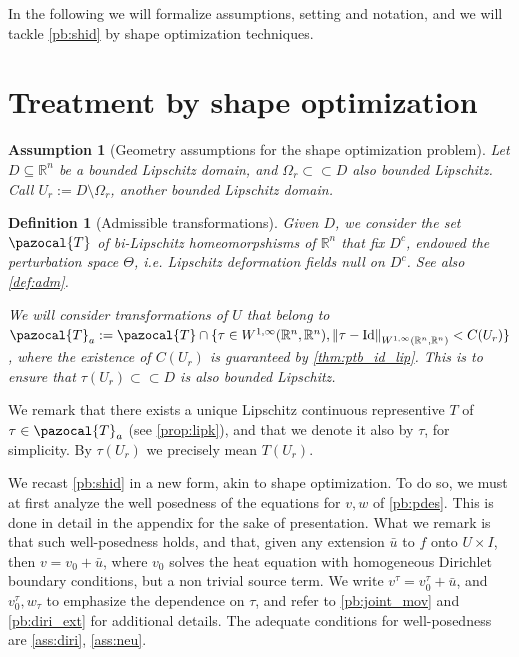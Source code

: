 \documentclass[english,a4paper,9pt,oneside]{scrbook}	%
\theoremstyle{break}
\newtheorem{defn}[equation]{Definition}
\newtheorem{ass}[equation]{Assumption}
\theoremstyle{remark}
\newcommand{\mR}{\mathbb{R}}
\newcommand{\norm}[1]{\left\lVert#1\right\rVert}
\newcommand{\cc}{\subset\subset}
\newcommand{\cT}{\pazocal{T}}
\newcommand{\id}{\text{Id}}
\newcommand{\Te}{\Theta}
\begin{document}
In the following we will formalize assumptions, setting and notation, and we will tackle \cref{pb:shid} by shape optimization techniques.

\section{Treatment by shape optimization}
\label{sec:shopt_treatment}

\begin{ass}[Geometry assumptions for the shape optimization problem]
\label{ass:geo_sh}
Let $D\subseteq \mR^n$ be a bounded Lipschitz domain, and $\Omega_r \cc D$ also bounded Lipschitz. Call $U_r:=D\setminus \Omega_r$, another bounded Lipschitz domain.
\end{ass}

\begin{defn}[Admissible transformations]

Given $D$, we consider the set $\cT$ of bi-Lipschitz homeomorpshisms of $\mR^n$ that fix $D^c$, endowed the perturbation space $\Te$, i.e. Lipschitz deformation fields null on $D^c$. See also \cref{def:adm}.

We will consider transformations of $U$ that belong to $\cT_a:=\cT \cap \{ \tau \in W^{1,\infty}(\mR^n, \mR^n), \norm{\tau - \id}_{W^{1,\infty}(\mR^n, \mR^n)}<C(U_r)\}$, where the existence of $C(U_r)$ is guaranteed by \cref{thm:ptb_id_lip}. This is to ensure that $\tau(U_r)\cc D$ is also bounded Lipschitz.


\end{defn}

We remark that there exists a unique Lipschitz continuous representive $T$ of $\tau \in \cT_a$ (see \cref{prop:lipk}), and that we denote it also by $\tau$, for simplicity. By $\tau(U_r)$ we precisely mean $T(U_r)$.

We recast \cref{pb:shid} in a new form, akin to shape optimization. To do so, we must at first analyze the well posedness of the equations for $v,w$ of \cref{pb:pdes}. This is done in detail in the appendix for the sake of presentation. What we remark is that such well-posedness holds, and that, given any extension $\bar{u}$ to $f$ onto $U\times I$, then $v = v_0+\bar{u}$, where $v_0$ solves the heat equation with homogeneous Dirichlet boundary conditions, but a non trivial source term. We write $v^\tau = v_0^\tau + \bar{u}$, and $v_0^\tau, w_\tau$ to emphasize the dependence on $\tau$, and refer to \cref{pb:joint_mov} and \cref{pb:diri_ext} for additional details. The adequate conditions for well-posedness are \cref{ass:diri}, \cref{ass:neu}.
\end{document}
